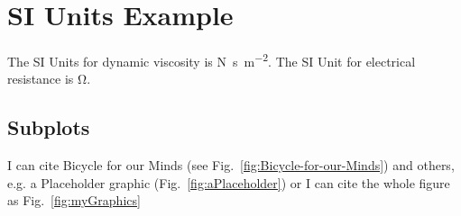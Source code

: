 \section{SI Units Example}
The SI Units for dynamic viscosity is \si{\newton\second\per\metre\squared}. The SI Unit for electrical resistance is \si{\ohm}.

\begin{landscape}

\section*{Subplots}
I can cite Bicycle for our Minds (see Fig.~\ref{fig:Bicycle-for-our-Minds}) and others, e.g. a Placeholder graphic (Fig.~\ref{fig:aPlaceholder}) or I can cite the whole figure as Fig.~\ref{fig:myGraphics}


\end{landscape}
